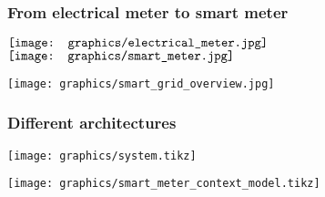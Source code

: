 \begin{frame}
  \frametitle{From electrical meter to smart meter}


\begin{minipage}{6in}
  
  $\vcenter{\hbox{\texttt{[image: graphics/electrical\_meter.jpg]}}}$
  \hspace*{.2in}
  $\vcenter{\hbox{\texttt{[image: graphics/smart\_meter.jpg]}}}$
  
\end{minipage}

\end{frame}

\begin{frame}
   \texttt{[image: graphics/smart\_grid\_overview.jpg]}
\end{frame}

\begin{frame}
  \frametitle{Different architectures}
  
\end{frame}

\begin{frame}
  \texttt{[image: graphics/system.tikz]}
\end{frame}

\begin{frame}
  \texttt{[image: graphics/smart\_meter\_context\_model.tikz]}
\end{frame}

